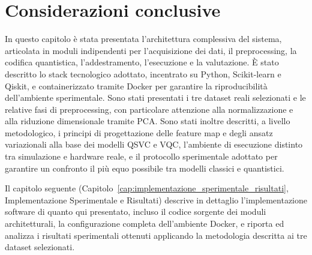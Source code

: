 \section{Considerazioni conclusive}
\label{sec:considerazioni_conclusive_metodologia}

In questo capitolo è stata presentata l'architettura complessiva del sistema, articolata in moduli indipendenti per l'acquisizione dei dati, il preprocessing, la codifica quantistica, l'addestramento, l'esecuzione e la valutazione. È stato descritto lo stack tecnologico adottato, incentrato su Python, Scikit-learn e Qiskit, e containerizzato tramite Docker per garantire la riproducibilità dell'ambiente sperimentale. Sono stati presentati i tre dataset reali selezionati e le relative fasi di preprocessing, con particolare attenzione alla normalizzazione e alla riduzione dimensionale tramite PCA. Sono stati inoltre descritti, a livello metodologico, i principi di progettazione delle feature map e degli ansatz variazionali alla base dei modelli QSVC e VQC, l'ambiente di esecuzione distinto tra simulazione e hardware reale, e il protocollo sperimentale adottato per garantire un confronto il più equo possibile tra modelli classici e quantistici.

Il capitolo seguente (Capitolo~\ref{cap:implementazione_sperimentale_risultati}, Implementazione Sperimentale e Risultati) descrive in dettaglio l'implementazione software di quanto qui presentato, incluso il codice sorgente dei moduli architetturali, la configurazione completa dell'ambiente Docker, e riporta ed analizza i risultati sperimentali ottenuti applicando la metodologia descritta ai tre dataset selezionati.
